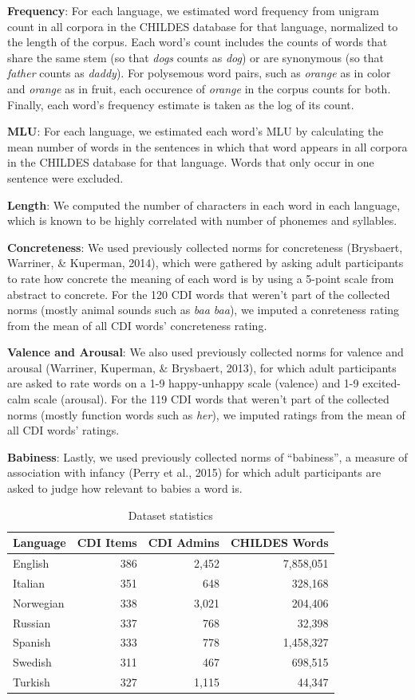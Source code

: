 \documentclass[10pt, letterpaper]{article}
\begin{document}
\textbf{Frequency}: For each language, we estimated word frequency from
unigram count in all corpora in the CHILDES database for that language,
normalized to the length of the corpus. Each word's count includes the
counts of words that share the same stem (so that \emph{dogs} counts as
\emph{dog}) or are synonymous (so that \emph{father} counts as
\emph{daddy}). For polysemous word pairs, such as \emph{orange} as in
color and \emph{orange} as in fruit, each occurence of \emph{orange} in
the corpus counts for both. Finally, each word's frequency estimate is
taken as the log of its count.

\textbf{MLU}: For each language, we estimated each word's MLU by
calculating the mean number of words in the sentences in which that word
appears in all corpora in the CHILDES database for that language. Words
that only occur in one sentence were excluded.

\textbf{Length}: We computed the number of characters in each word in
each language, which is known to be highly correlated with number of
phonemes and syllables.

\textbf{Concreteness}: We used previously collected norms for
concreteness (Brysbaert, Warriner, \& Kuperman, 2014), which were
gathered by asking adult participants to rate how concrete the meaning
of each word is by using a 5-point scale from abstract to concrete. For
the 120 CDI words that weren't part of the collected norms (mostly
animal sounds such as \emph{baa baa}), we imputed a conreteness rating
from the mean of all CDI words' concreteness rating.

\textbf{Valence and Arousal}: We also used previously collected norms
for valence and arousal (Warriner, Kuperman, \& Brysbaert, 2013), for
which adult participants are asked to rate words on a 1-9 happy-unhappy
scale (valence) and 1-9 excited-calm scale (arousal). For the 119 CDI
words that weren't part of the collected norms (mostly function words
such as \emph{her}), we imputed ratings from the mean of all CDI words'
ratings.

\textbf{Babiness}: Lastly, we used previously collected norms of
``babiness'', a measure of association with infancy (Perry et al., 2015)
for which adult participants are asked to judge how relevant to babies a
word is.

\begin{table}[t]
\centering
\begin{tabular}{lrrr}
  \hline
Language & CDI Items & CDI Admins & CHILDES Words \\ 
  \hline
English & 386 & 2,452 & 7,858,051 \\ 
  Italian & 351 & 648 & 328,168 \\ 
  Norwegian & 338 & 3,021 & 204,406 \\ 
  Russian & 337 & 768 & 32,398 \\ 
  Spanish & 333 & 778 & 1,458,327 \\ 
  Swedish & 311 & 467 & 698,515 \\ 
  Turkish & 327 & 1,115 & 44,347 \\ 
   \hline
\end{tabular}
\caption{Dataset statistics} 
\end{table}
\end{document}
